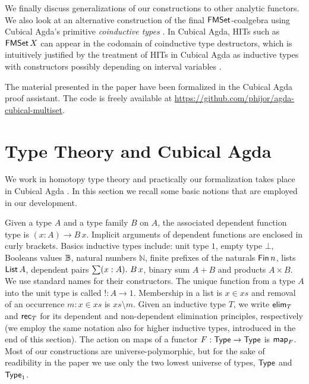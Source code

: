 \documentclass[runningheads]{llncs}
\begin{document}
We finally discuss generalizations of our constructions to other analytic functors. We also look at an alternative construction of the final $\operatorname{\mathsf{FMSet}}$-coalgebra using Cubical Agda's primitive \emph{coinductive types} \cite{Vezzosi2019}. In Cubical Agda, HITs such as $\operatorname{\mathsf{FMSet}} X$ can appear in the codomain of coinductive type destructors, which is intuitively justified by the treatment of HITs in Cubical Agda as inductive types with constructors possibly depending on interval variables \cite{Coquand2018,Cavallo2019}.

The material presented in the paper have been formalized in the Cubical Agda proof
assistant. The code is freely available at \url{https://github.com/phijor/agda-cubical-multiset}.

\section{Type Theory and Cubical Agda}

We work in homotopy type theory \cite{HoTTBook} and practically our formalization takes place in Cubical Agda \cite{Vezzosi2019}. In this section we recall some basic notions that are employed in our development.

Given a type $A$ and a type family $B$ on $A$, the associated dependent function type is $(x : A) \to B \, x$. Implicit arguments of dependent functions are enclosed in curly brackets. Basics inductive types include: unit type $1$, empty type $\bot$, Booleans values $\mathbb{B}$, natural numbers $ℕ$, finite prefixes of the naturals $\operatorname{\mathsf{Fin}} n$, lists $\operatorname{\mathsf{List}} A$, dependent pairs $\sum (x : A) \mathpunct{.}\, B \, x$, binary sum $A + B$ and products $A \times B$. We use standard names for their constructors. The unique function from a type $A$ into the unit type is called $! : A \to 1$. Membership in a list is $x \in xs$ and removal of an occurrence $m : x \in xs$ is $xs \setminus m$. Given an inductive type $T$, we write $\operatorname{\mathsf{elim}}_{T}$ and $\operatorname{\mathsf{rec}}_{T}$ for its dependent and non-dependent elimination  principles, respectively (we employ the same notation also for higher inductive types, introduced in the end of this section). The action on maps of a functor $F : \operatorname{\mathsf{Type}} \to \operatorname{\mathsf{Type}}$ is $\operatorname{\mathsf{map}}_{F}$. Most of our constructions are universe-polymorphic, but for the sake of readibility in the paper we use only the two lowest universe of types, $\operatorname{\mathsf{Type}}$ and $\operatorname{\mathsf{Type}}_1$.
\end{document}
